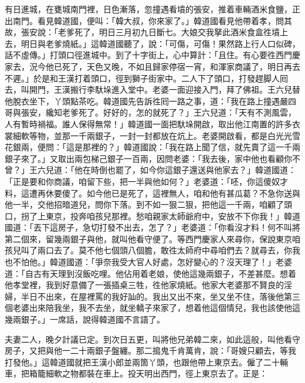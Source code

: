 有日進城，在甕城南門裡，日色漸落，忽撞遇看墳的張安，推着車輛酒米食鹽，正出南門。看見韓道國，便叫：「韓大叔，你來家了。」韓道國看見他帶着孝，問其故，張安說：「老爹死了，明日三月初九日斷七。大娘交我拏此酒米食盒徃墳上去，明日與老爹燒紙。」這韓道國聽了，說：「可傷，可傷！果然路上行人口似碑，話不虛傳。」打頭口徑進城中。到了十字街上，心中算計：「且住。有心要徃西門慶家去，況今他已死了，天色又晚，不如且歸家停宿一宵，和渾家商議了，明日再去不遲。」{}於是和王漢打着頭口，徑到獅子街家中。二人下了頭口，打發趕脚人囘去，叫開門，王漢搬行李馱垛進入堂中。老婆一面迎接入門，拜了佛祖。王六兒替他脫衣坐下，丫頭點茶吃。韓道國先告訴徃囘一路之事，道：「我在路上撞遇嚴四哥與張安，纔知老爹死了。好好的，怎的就死了？」王六兒道：「天有不測風雲，人有暫時禍福。誰人保得無常！」韓道國一面把馱垛開啟，取出他江南置的許多衣裳細軟等物，並那一千兩銀子，一封一封都放在炕上。老婆開啟看，都是白光光雪花銀兩，便問：「這是那裡的？」韓道國說：「我在路上聞了信，就先賣了這一千兩銀子來了。」又取出兩包梯己銀子一百兩，因問老婆：「我去後，家中他也看顧你不曾？」王六兒道：「他在時倒也罷了，如今你這銀子還送與他家去？」韓道國道：「正是要和你商議，咱留下些，把一半與他如何？」老婆道：「呸，你這傻奴才料，這遭再休要傻了。如今他已是死了，這裡無人，咱和他有甚瓜葛？不急你送與他一半，交他招暗道兒，問你下落。到不如一狠二狠，把他這一千兩，咱顧了頭口，拐了上東京，投奔咱孩兒那裡。愁咱親家太師爺府中，安放不下你我！」{}韓道國道：「丟下這房子，急切打發不出去，怎了？」老婆道：「你看沒才料！何不叫將第二個來，{}留幾兩銀子與他，就叫他看守便了。等西門慶家人來尋你，保說東京咱孩兒叫了兩口去了。莫不他七個頭八個膽，敢徃太師府中尋咱們去？就尋去，你我也不怕他。」韓道國道：「爭奈我受大官人好處，怎好變心的？沒天理了！」{}老婆道：「自古有天理到沒飯吃哩。他佔用着老娘，使他這幾兩銀子，不差甚麼。{}想着他孝堂裡，我到好意備了一張插桌三牲，徃他家燒紙。他家大老婆那不賢良的淫婦，半日不出來，在屋裡罵的我好訕的。{}我出又出不來，坐又坐不住，落後他第三個老婆出來陪我坐，我不去坐，就坐轎子來家了，想着他這個情兒，我也該使他這幾兩銀子。」一席話，說得韓道國不言語了。

夫妻二人，晚夕計議已定。到次日五更，叫將他兄弟韓二來，如此這般，叫他看守房子，又把與他一二十兩銀子盤纏。那二搗鬼千肯萬肯，說：「哥嫂只顧去，等我打發他。」這韓道國就把王漢小郎並兩箇丫頭，也跟他帶上東京去。僱了二十輛車，把箱籠細軟之物都裝在車上。投天明出西門，徑上東京去了。正是：

